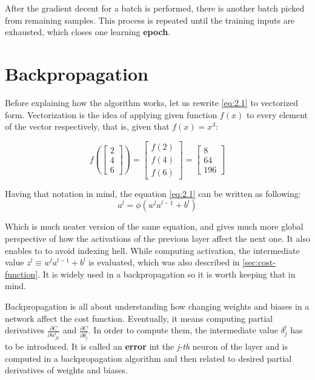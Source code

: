 After the gradient decent for a batch is performed, there is another batch picked from remaining samples. This process is repeated until the training inputs are exhausted, which closes one learning \textbf{epoch}.

\section{Backpropagation}
\label{sec:backpropagation}

Before explaining how the algorithm works, let us rewrite \ref{eq:2.1} to vectorized form. Vectorization is the idea of applying given function $f(x)$ to every element of the vector respectively, that is, given that $f(x) = x^3$:

\begin{equation}
    f\left(\begin{bmatrix}
         2 \\
         4 \\
         6
    \end{bmatrix}
    \right) =
    \begin{bmatrix}
        f(2) \\
        f(4) \\
        f(6)
    \end{bmatrix} = 
    \begin{bmatrix}
        8 \\
        64 \\
        196
    \end{bmatrix}
\end{equation}

Having that notation in mind, the equation \ref{eq:2.1} can be written as following:
\begin{equation}
    a^l = \phi \left(w^la^{l-1} + b^l \right)
\end{equation}

Which is much neater version of the same equation, and gives much more global perspective of how the activations of the previous layer affect the next one. It also enables to to avoid indexing hell.
While computing activation, the intermediate value $z^l \equiv w^la^{l-1}+b^l$ is evaluated, which was also described in \ref{sec:cost-function}. It is widely used in a backpropagation so it is worth keeping that in mind.

\vspace{.5cm}

Backpropagation is all about understanding how changing weights and biases in a network affect the cost function. Eventually, it means computing partial derivatives $\frac{\partial C}{\partial w^l_{jk}}$ and $\frac{\partial C}{\partial b^l_j}$. In order to compute them, the intermediate value $\delta^l_j$ has to be introduced. It is called an \textbf{error} int the \emph{j-th} neuron of the  layer and is computed in a backpropagation algorithm and then related to desired partial derivatives of weights and biases.

